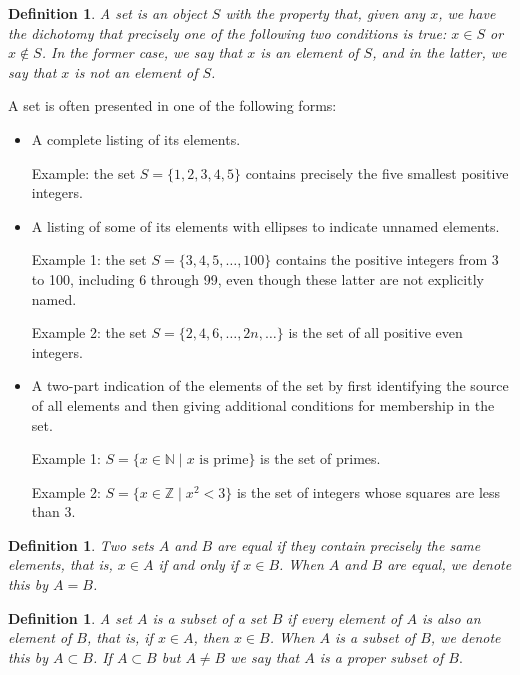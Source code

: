 \documentclass{amsart}
\newtheorem{definition}[theorem]{Definition}
\newcommand{\1}{\mathds{1}}
\numberwithin{equation}{section}
\numberwithin{theorem}{section}
\begin{document}
\begin{definition}\label{d.sets}
A {\em set} is an object $S$ with the property that, given any $x$, we have the dichotomy that precisely
one of the following two conditions is true: $x\in S$ or $x\not\in S$.  In the former case, we say that $x$ is an 
{\em element} of $S$, and in the latter, we say that $x$ is not an element of $S$.
\end{definition}


A set is often presented in one of the following forms:
\begin{itemize}
\item
A complete listing of its elements.

Example:  the set $S=\{1,2,3,4,5\}$ contains precisely the 
five smallest positive integers.


\item
A listing of some of its elements with ellipses to indicate unnamed elements.

Example 1:  the set $S=\{3, 4, 5, \ldots, 100\}$ contains the positive integers from 3 to 100,
including 6 through 99, even though these latter are not explicitly named.  


Example 2:  the set $S=\{2, 4, 6, \ldots, 2n, \ldots \}$ is the set of all positive even integers.


\item
A two-part indication of the elements of the set by first identifying the source of all elements
and then giving additional conditions for membership in the set.

Example 1: 
$S=\{x\in {\mathbb N}\mid \mbox{$x$ is prime}\}$ is the set of primes.  


Example 2:
$S=\{x\in {\mathbb Z}\mid \mbox{$x^2<3$}\}$ is the set of integers whose squares are less than 3.
\end{itemize}

\begin{definition}  
Two sets $A$ and $B$ are equal if they contain precisely the same elements, that is, $x\in A$
if and only if $x\in B$.  When $A$ and $B$ are equal, we denote this by $A=B$.
\end{definition}

\begin{definition}  
A set $A$ is a {\em subset} of a set $B$ if every element of $A$ is also an element of $B$, that is,
if $x\in A$, then $x\in B$.  When $A$ is a subset of $B$, we denote this by $A\subset B$.  If $A\subset B$ but $A\neq B$ 
we say that $A$ is a {\em proper} subset of $B.$ 
\end{definition}
\end{document}
